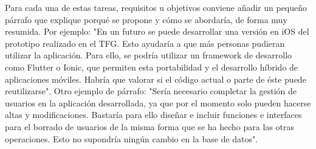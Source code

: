  Para cada una de estas tareas, requisitos u objetivos conviene añadir un pequeño párrafo que explique porqué se propone y cómo se abordaría, de forma muy resumida. Por ejemplo: "En un futuro se puede desarrollar una versión en iOS del prototipo realizado en el TFG. Esto ayudaría a que más personas pudieran utilizar la aplicación. Para ello, se podría utilizar un framework de desarrollo como Flutter o Ionic, que permiten esta portabilidad y el desarrollo híbrido de aplicaciones móviles. Habría que valorar si el código actual o parte de éste puede reutilizarse". Otro ejemplo de párrafo: "Sería necesario completar la gestión de usuarios en la aplicación desarrollada, ya que por el momento solo pueden hacerse altas y modificaciones. Bastaría para ello diseñar e incluir funciones e interfaces para el borrado de usuarios de la misma forma que se ha hecho para las otras operaciones. Esto no supondría ningún cambio en la base de datos". 

 

 